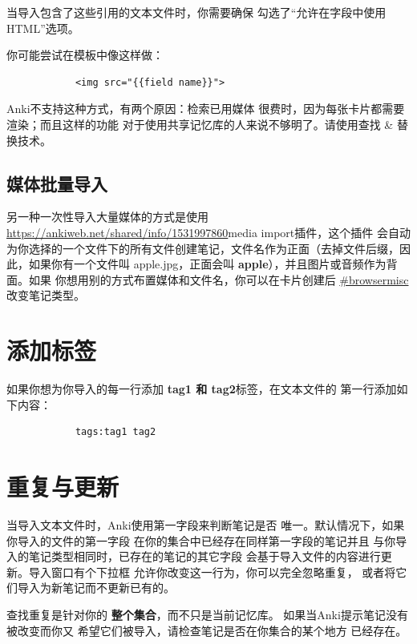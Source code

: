 \documentclass[a4paper]{book}
\newcounter{img}[chapter]
\begin{document}
		
		\begin{shaded}
			当导入包含了这些引用的文本文件时，你需要确保 勾选了“允许在字段中使用HTML”选项。
		\end{shaded}
		
		你可能尝试在模板中像这样做：
		\begin{shaded}\begin{verbatim}
			<img src="{{field name}}">
			\end{verbatim}\end{shaded}
		
		Anki不支持这种方式，有两个原因：检索已用媒体 很费时，因为每张卡片都需要渲染；而且这样的功能 对于使用共享记忆库的人来说不够明了。请使用查找 \& 替换技术。
		
		\subsection{媒体批量导入}
		另一种一次性导入大量媒体的方式是使用
		\url{https://ankiweb.net/shared/info/1531997860}media import插件，这个插件 会自动为你选择的一个文件下的所有文件创建笔记，文件名作为正面（去掉文件后缀，因此，如果你有一个文件叫 apple.jpg，正面会叫 \textbf{apple}），并且图片或音频作为背面。如果 你想用别的方式布置媒体和文件名，你可以在卡片创建后
		\url{#browsermisc}改变笔记类型。
		\section{添加标签}
		
		如果你想为你导入的每一行添加 \textbf{tag1 和 tag2}标签，在文本文件的 第一行添加如下内容：
		
		\begin{shaded}\begin{verbatim}
			tags:tag1 tag2
			\end{verbatim}\end{shaded}
		
		\section{重复与更新}
		
		当导入文本文件时，Anki使用第一字段来判断笔记是否 唯一。默认情况下，如果你导入的文件的第一字段 在你的集合中已经存在同样第一字段的笔记并且 与你导入的笔记类型相同时，已存在的笔记的其它字段 会基于导入文件的内容进行更新。导入窗口有个下拉框 允许你改变这一行为，你可以完全忽略重复， 或者将它们导入为新笔记而不更新已有的。
		
		\begin{shaded}
			查找重复是针对你的 \textbf{整个集合}，而不只是当前记忆库。 如果当Anki提示笔记没有被改变而你又 希望它们被导入，请检查笔记是否在你集合的某个地方 已经存在。
		\end{shaded}
		
\end{document}
